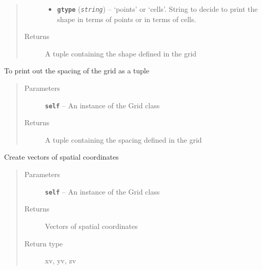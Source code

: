 \documentclass[letterpaper,10pt,english]{sphinxmanual}
\begin{document}
\begin{fulllineitems}
\begin{fulllineitems}
\begin{quote}
\begin{description}
\begin{itemize}
\item {} 
\textbf{\texttt{gtype}} (\emph{\texttt{string}}) -- `points' or `cells'. String to decide to print the shape in terms of points or in terms of cells.

\end{itemize}

\item[{Returns}] \leavevmode
A tuple containing the shape defined in the grid

\end{description}\end{quote}

\end{fulllineitems}


\begin{fulllineitems}
\label{hyvr:hyvr.hyvr.grid.Grid.spacing}
To print out the spacing of the grid as a tuple
\begin{quote}\begin{description}
\item[{Parameters}] \leavevmode
\textbf{\texttt{self}} -- An instance of the Grid class

\item[{Returns}] \leavevmode
A tuple containing the spacing defined in the grid

\end{description}\end{quote}

\end{fulllineitems}


\begin{fulllineitems}
\label{hyvr:hyvr.hyvr.grid.Grid.vec}
Create vectors of spatial coordinates
\begin{quote}\begin{description}
\item[{Parameters}] \leavevmode
\textbf{\texttt{self}} -- An instance of the Grid class

\item[{Returns}] \leavevmode
Vectors of spatial coordinates

\item[{Return type}] \leavevmode
xv, yv, zv

\end{description}\end{quote}


\end{fulllineitems}
\end{fulllineitems}
\end{document}
